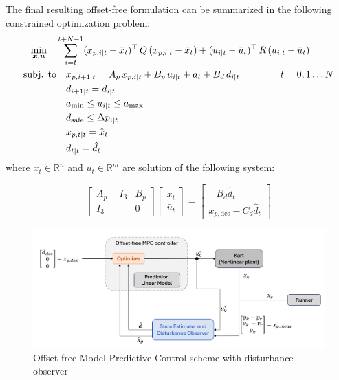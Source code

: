 \documentclass[a4paper,12pt,oneside]{book}
\begin{document}
\bigskip
The final resulting offset-free formulation can be summarized in the following constrained optimization problem:
\begin{equation}
\begin{alignedat}{2}
	\min_{\substack{\boldsymbol{x}, \boldsymbol{u}}}\quad & \sum_{i=t}^{t+N-1} (x_{p,i|t} - \bar{x}_t) ^\top \, Q \, (x_{p,i|t} -  \bar{x}_t) +  (u_{i|t} - \bar{u}_t)^\top \, R \, (u_{i|t} - \bar{u}_t) &&  \\
	\text{subj. to} & \quad x_{p,i+1|t}  = A_p \, x_{p,i|t} + B_p \, u_{i|t} + a_t + B_d \, d_{i|t} \hspace{1.5cm} t = 0, 1 \ldots N &&  \\
    & \quad d_{i+1|t}  = d_{i|t} && \\
    &\quad a_{\text{min}} \leq u_{i|t} \leq a_{\text{max}}&& \\
    &\quad d_{\text{safe}}\leq \Delta p_{i|t} &&  \\
    &\quad x_{p,t|t} = \hat{x}_t && \\
    &\quad d_{t|t} = \hat{d}_t && 
\end{alignedat}
\label{MPC:offset-free}
\end{equation}
where $\bar{x}_t \in \mathbb{R}^n$ and $\bar{u}_t \in \mathbb{R}^m$ are solution of the following system:

\begin{equation}
    \begin{bmatrix}
    A_p-I_3 & B_p \\
    I_3 & 0
	\end{bmatrix}
 	\begin{bmatrix}
		\bar{x}_t \\
		\bar{u}_t
	\end{bmatrix}
    =
    \begin{bmatrix}
    -B_d \hat{d}_t\\
    x_{p,\text{des}} - C_d \hat{d}_t
	\end{bmatrix}
\end{equation}

\begin{figure}
	\centering
	\includegraphics[width=1.0\textwidth]{MPC_of_scheme.png}
	\caption{Offset-free Model Predictive Control scheme with disturbance observer}
	\label{image:mpc_of_scheme}
\end{figure}
\end{document}
